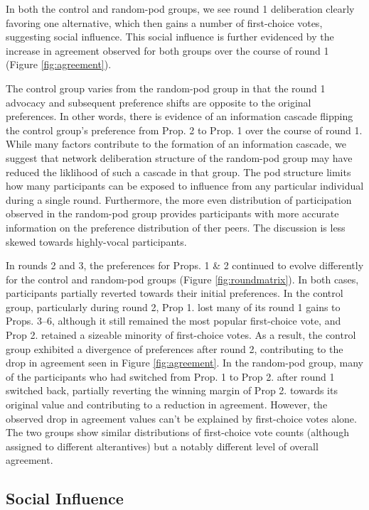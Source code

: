 {In both the control and random-pod groups, we see round 1 deliberation clearly favoring one alternative, which then gains a number of first-choice votes, suggesting social influence.
This social influence is further evidenced by the increase in agreement observed for both groups over the course of round 1 (Figure \ref{fig:agreement}).

The control group varies from the random-pod group in that the round 1 advocacy and subsequent preference shifts are opposite to the original preferences.
In other words, there is evidence of an information cascade flipping the control group's preference from Prop. 2 to Prop. 1 over the course of round 1.
While many factors contribute to the formation of an information cascade, we suggest that network deliberation structure of the random-pod group may have reduced the liklihood of such a cascade in that group.
The pod structure limits how many participants can be exposed to influence from any particular individual during a single round.
Furthermore, the more even distribution of participation observed in the random-pod group provides participants with more accurate information on the preference distribution of ther peers.
The discussion is less skewed towards highly-vocal participants.

In rounds 2 and 3, the preferences for Props. 1 \& 2 continued to evolve differently for the control and random-pod groups (Figure \ref{fig:roundmatrix}).
In both cases, participants partially reverted towards their initial preferences.
In the control group, particularly during round 2, Prop 1. lost many of its round 1 gains to Props. 3--6, although it still remained the most popular first-choice vote,
and Prop 2. retained a sizeable minority of first-choice votes.
As a result, the control group exhibited a divergence of preferences after round 2, contributing to the drop in agreement seen in Figure \ref{fig:agreement}.
In the random-pod group, many of the participants who had switched from Prop. 1 to Prop 2. after round 1 switched back,
partially reverting the winning margin of Prop 2. towards its original value and contributing to a reduction in agreement.
However, the observed drop in agreement values can't be explained by first-choice votes alone.
The two groups show similar distributions of first-choice vote counts (although assigned to different alterantives) but a notably different level of overall agreement.

\subsection{Social Influence}
\label{sec:res-socialinfluence}

}
